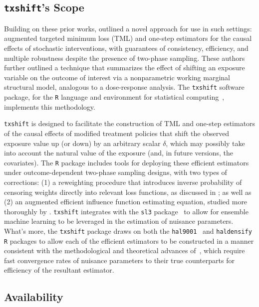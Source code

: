 \subsection{\texttt{txshift}'s Scope}

Building on these prior works, \citet{hejazi2020efficient} outlined a novel
approach for use in such settings: augmented targeted minimum loss (TML) and
one-step estimators for the causal effects of stochastic interventions, with
guarantees of consistency, efficiency, and multiple robustness despite the
presence of two-phase sampling. These authors further outlined a technique that
summarizes the effect of shifting an exposure variable on the outcome of
interest via a nonparametric working marginal structural model, analogous to
a dose-response analysis. The \texttt{txshift} software package, for the
\texttt{R} language and environment for statistical computing~\citep{R},
implements this methodology.

\texttt{txshift} is designed to facilitate the construction of TML and one-step
estimators of the causal effects of modified treatment policies that shift the
observed exposure value up (or down) by an arbitrary scalar $\delta$, which may
possibly take into account the natural value of the exposure (and, in future
versions, the covariates). The \texttt{R} package includes tools for deploying
these efficient estimators under outcome-dependent two-phase sampling designs,
with two types of corrections: (1) a reweighting procedure that introduces
inverse probability of censoring weights directly into relevant loss functions,
as discussed in \citet{rose2011targeted2sd}; as well as (2) an augmented
efficient influence function estimating equation, studied more thoroughly by
\citet{hejazi2020efficient}. \texttt{txshift} integrates with the \texttt{sl3}
package~\citep{coyle2020sl3} to allow for ensemble machine learning to be
leveraged in the estimation of nuisance parameters. What's more, the
\texttt{txshift} package draws on both the
\texttt{hal9001}~\citep{coyle2021hal9001,hejazi2020hal9001} and
\texttt{haldensify}~\citep{hejazi2020haldensify} \texttt{R} packages to allow
each of the efficient estimators to be constructed in a manner consistent with
the methodological and theoretical advances of~\citet{hejazi2020efficient},
which require fast convergence rates of nuisance parameters to their true
counterparts for efficiency of the resultant estimator.

\subsection{Availability}

